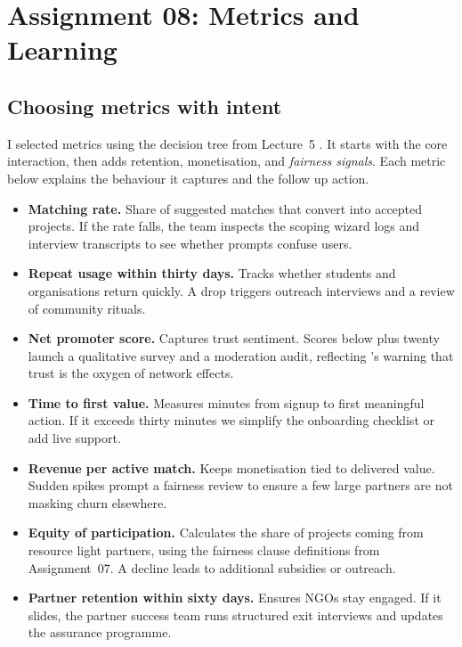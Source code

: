 \section*{Assignment 08: Metrics and Learning}

\subsection*{Choosing metrics with intent}
I selected metrics using the decision tree from Lecture~5 \citep{Lecture05}. It starts with the core interaction, then adds retention, monetisation, and \textit{fairness signals}. Each metric below explains the behaviour it captures and the follow up action.
\begin{itemize}
    \item \textbf{Matching rate.} Share of suggested matches that convert into accepted projects. If the rate falls, the team inspects the scoping wizard logs and interview transcripts to see whether prompts confuse users.
    \item \textbf{Repeat usage within thirty days.} Tracks whether students and organisations return quickly. A drop triggers outreach interviews and a review of community rituals.
    \item \textbf{Net promoter score.} Captures trust sentiment. Scores below plus twenty launch a qualitative survey and a moderation audit, reflecting \citet{Choudary2016}'s warning that trust is the oxygen of network effects.
    \item \textbf{Time to first value.} Measures minutes from signup to first meaningful action. If it exceeds thirty minutes we simplify the onboarding checklist or add live support.
    \item \textbf{Revenue per active match.} Keeps monetisation tied to delivered value. Sudden spikes prompt a fairness review to ensure a few large partners are not masking churn elsewhere.
    \item \textbf{Equity of participation.} Calculates the share of projects coming from resource light partners, using the fairness clause definitions from Assignment~07. A decline leads to additional subsidies or outreach.
    \item \textbf{Partner retention within sixty days.} Ensures NGOs stay engaged. If it slides, the partner success team runs structured exit interviews and updates the assurance programme.
\end{itemize}

